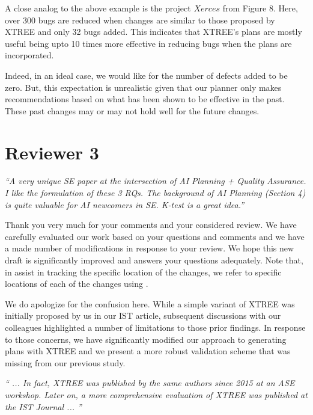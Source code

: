 A close analog to the above example is the project $\mathit{Xerces}$ from Figure 8. Here, over 300 bugs are reduced when changes are similar to those proposed by XTREE and only 32 bugs added. This indicates that XTREE's plans are mostly useful being upto 10 times more effective in reducing bugs when the plans are incorporated. 

Indeed, in an ideal case, we would like for the number of defects added to be zero. But, this expectation is unrealistic given that our planner only makes recommendations based on what has been shown to be effective in the past. These past changes may or may not hold well for the future changes. 



\section*{Reviewer 3}

\noindent\textit{``A very unique SE paper at the intersection of AI Planning + Quality Assurance. I like the formulation of these 3 RQs. The background of AI Planning (Section 4) is quite valuable for AI newcomers in SE. K-test is a great idea.''}

Thank you very much for your comments and your considered review. We have carefully evaluated our work based on your questions and comments and we have a made number of modifications in response to your review. We hope this new draft is significantly improved and answers your questions adequately. Note that, in assist in tracking the specific location of the changes, we refer to specific locations of each of the changes using .


We do apologize for the confusion here. While a simple variant of XTREE was initially proposed by us in our IST article, subsequent discussions with our colleagues highlighted a number of limitations to those prior findings. In response to those concerns, we have significantly modified our approach to generating plans with XTREE and we present a more robust validation scheme that was missing from our previous study.   

\noindent\textit{`` ... In fact, XTREE was published by the same authors since 2015 at an ASE workshop. Later on, a more comprehensive evaluation of XTREE was published at the IST Journal ... '' 
}

